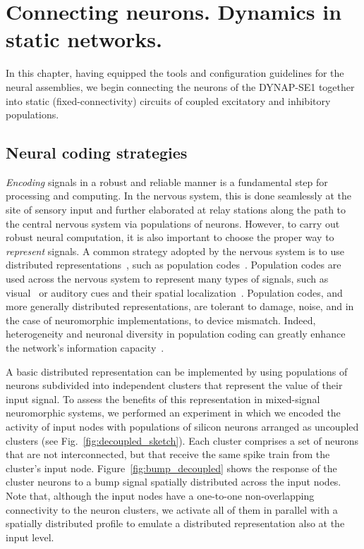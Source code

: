\chapter{Connecting neurons. Dynamics in static networks.}
\label{ch:static_networks}

In this chapter, having equipped the tools and configuration guidelines for the neural assemblies, we begin connecting the neurons of the \ac{DYNAP}-SE1 together into static (fixed-connectivity) circuits of coupled excitatory and inhibitory populations. 

\section{Neural coding strategies}


\emph{Encoding} signals in a robust and reliable manner is a fundamental step for processing and computing.
In the nervous system, this is done seamlessly at the site of sensory input and further elaborated at relay stations along the path to the central nervous system via populations of neurons.
However, to carry out robust neural computation, it is also important to choose the proper way to \emph{represent} signals.
A common strategy adopted by the nervous system is to use distributed representations~\cite{Dayan_Abbott01}, such as population codes~\cite{Averbeck_etal06}.
Population codes are used across the nervous system to represent many types of signals, such as visual~\cite{Franke_etal16} or auditory cues and their spatial localization~\cite{Fitzpatrick_etal97}.
Population codes, and more generally distributed representations, are tolerant to damage, noise, and in the case of neuromorphic implementations, to device mismatch.
Indeed, heterogeneity and neuronal diversity in population coding can greatly enhance the network's information capacity~\cite{Shamir_Sompolinsky06}.

A basic distributed representation can be implemented by using populations of neurons subdivided into independent clusters that represent the value of their input signal.
To assess the benefits of this representation in mixed-signal neuromorphic systems, we performed an experiment in which we encoded the activity of input nodes with populations of silicon neurons arranged as uncoupled clusters (see Fig.~\ref{fig:decoupled_sketch}). Each cluster comprises a set of neurons that are not interconnected, but that receive the same spike train from the cluster's input node.
Figure~\ref{fig:bump_decoupled} shows the response of the cluster neurons to a bump signal spatially distributed across the input nodes.
Note that, although the input nodes have a one-to-one non-overlapping connectivity to the neuron clusters, we activate all of them in parallel with a spatially distributed profile  to emulate a distributed representation also at the input level.

